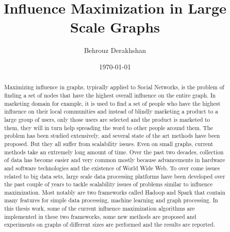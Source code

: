 \documentclass[english]{tktltiki}
\begin{document}
\onehalfspacing

\title{Influence Maximization in Large Scale Graphs}
\author{Behrouz Derakhshan}
\date{\today}

\maketitle



\begin{abstract}

Maximizing influence in graphs, typically applied to Social Networks, is the problem of finding a set of nodes that have the highest overall influence on the entire graph. In marketing domain for example, it is used to find a set of people who have the highest influence on their local communities and instead of blindly marketing a product to a large group of users, only those users are selected and the product is marketed to them, they will in turn help spreading the word to other people around them. The problem has been studied extensively, and several state of the art methods have been proposed. But they all suffer from scalability issues. Even on small graphs, current methods take an extremely long amount of time. Over the past two decades, collection of data has become easier and very common mostly because advancements in hardware and software technologies and the existence of World Wide Web. To over come issues related to big data sets, large scale data processing platforms have been developed over the past couple of years to tackle scalability issues of problems similar to influence maximization. Most notably are two frameworks called Hadoop and Spark that contain many features for simple data processing, machine learning and graph processing. In this thesis work, some of the current influence maximization algorithms are implemented in these two frameworks, some new methods are proposed and experiments on graphs of different sizes are performed and the results are reported. 

\end{abstract}
\end{document}
